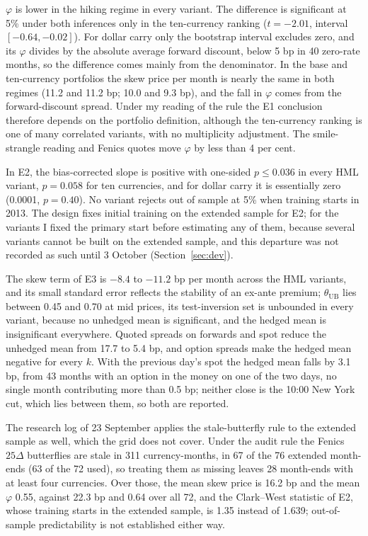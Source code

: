 \documentclass[11pt]{article}
\theoremstyle{result}
\newcommand{\thUB}{\theta_{\mathrm{UB}}}
\newcommand{\D}{\Delta}
\begin{document}
$\varphi$ is lower in the hiking regime in every variant. The difference is significant at 5\% under both inferences only in the ten-currency ranking ($t=-2.01$, interval $[-0.64,-0.02]$). For dollar carry only the bootstrap interval excludes zero, and its $\varphi$ divides by the absolute average forward discount, below 5 bp in 40 zero-rate months, so the difference comes mainly from the denominator. In the base and ten-currency portfolios the skew price per month is nearly the same in both regimes (11.2 and 11.2 bp; 10.0 and 9.3 bp), and the fall in $\varphi$ comes from the forward-discount spread. Under my reading of the rule the E1 conclusion therefore depends on the portfolio definition, although the ten-currency ranking is one of many correlated variants, with no multiplicity adjustment. The smile-strangle reading and Fenics quotes move $\varphi$ by less than 4 per cent.

In E2, the bias-corrected slope is positive with one-sided $p\le0.036$ in every HML variant, $p=0.058$ for ten currencies, and for dollar carry it is essentially zero (0.0001, $p=0.40$). No variant rejects out of sample at 5\% when training starts in 2013. The design fixes initial training on the extended sample for E2; for the variants I fixed the primary start before estimating any of them, because several variants cannot be built on the extended sample, and this departure was not recorded as such until 3 October (Section~\ref{sec:dev}).

The skew term of E3 is $-8.4$ to $-11.2$ bp per month across the HML variants, and its small standard error reflects the stability of an ex-ante premium; $\thUB$ lies between 0.45 and 0.70 at mid prices, its test-inversion set is unbounded in every variant, because no unhedged mean is significant, and the hedged mean is insignificant everywhere. Quoted spreads on forwards and spot reduce the unhedged mean from 17.7 to 5.4 bp, and option spreads make the hedged mean negative for every $k$. With the previous day's spot the hedged mean falls by 3.1 bp, from 43 months with an option in the money on one of the two days, no single month contributing more than 0.5 bp; neither close is the 10:00 New York cut, which lies between them, so both are reported.

The research log of 23 September applies the stale-butterfly rule to the extended sample as well, which the grid does not cover. Under the audit rule the Fenics $25\D$ butterflies are stale in 311 currency-months, in 67 of the 76 extended month-ends (63 of the 72 used), so treating them as missing leaves 28 month-ends with at least four currencies. Over those, the mean skew price is 16.2 bp and the mean $\varphi$ 0.55, against 22.3 bp and 0.64 over all 72, and the Clark--West statistic of E2, whose training starts in the extended sample, is 1.35 instead of 1.639; out-of-sample predictability is not established either way.
\end{document}

